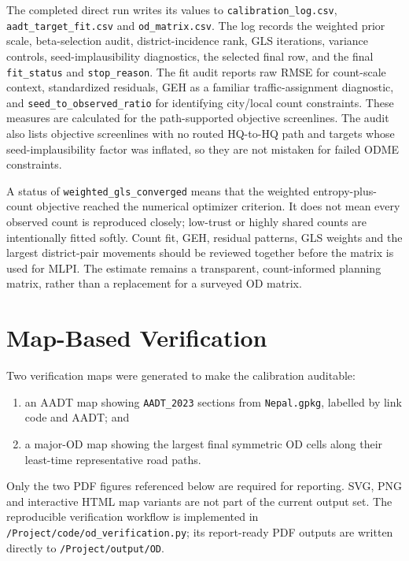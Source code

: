 \documentclass[11pt,a4paper]{article}
\begin{document}
The completed direct run writes its values to \texttt{calibration\_log.csv},
\texttt{aadt\_target\_fit.csv} and \texttt{od\_matrix.csv}. The log records
the weighted prior scale, beta-selection audit, district-incidence rank, GLS
iterations, variance controls, seed-implausibility diagnostics, the selected final
row, and the final \texttt{fit\_status} and \texttt{stop\_reason}. The fit
audit reports raw RMSE for count-scale context, standardized residuals, GEH as
a familiar traffic-assignment diagnostic, and
\texttt{seed\_to\_observed\_ratio} for identifying city/local count
constraints. These measures are calculated for the path-supported objective
screenlines. The audit also lists objective screenlines with no routed
HQ-to-HQ path and targets whose seed-implausibility factor was inflated, so
they are not mistaken for failed ODME constraints.

A status of \texttt{weighted\_gls\_converged} means that the weighted
entropy-plus-count objective reached the numerical optimizer criterion. It does
not mean every observed count is reproduced closely; low-trust or highly shared
counts are intentionally fitted softly. Count fit, GEH, residual patterns, GLS
weights and the largest district-pair movements should be reviewed together
before the matrix is used for MLPI. The estimate remains a transparent,
count-informed planning matrix, rather than a replacement for a surveyed OD
matrix.

\section{Map-Based Verification}

Two verification maps were generated to make the calibration auditable:

\begin{enumerate}
    \item an AADT map showing \texttt{AADT\_2023} sections from
    \texttt{Nepal.gpkg}, labelled by link code and AADT; and
    \item a major-OD map showing the largest final symmetric OD cells along their
    least-time representative road paths.
\end{enumerate}

Only the two PDF figures referenced below are required for reporting. SVG, PNG
and interactive HTML map variants are not part of the current output set.
The reproducible verification workflow is implemented in
\texttt{/Project/code/od\_verification.py}; its report-ready PDF outputs are
written directly to \texttt{/Project/output/OD}.
\end{document}
